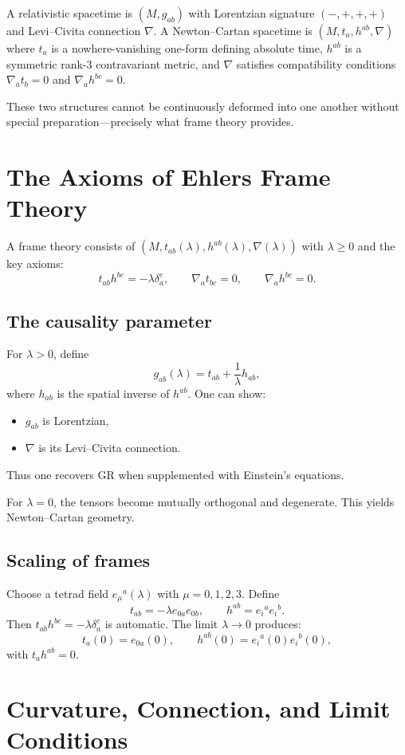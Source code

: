 \documentclass[12pt]{article}
\begin{document}
A relativistic spacetime is $(M,g_{ab})$ with 
Lorentzian signature $(-,+,+,+)$ and Levi--Civita connection $\nabla$.
A Newton--Cartan spacetime is $(M,t_a,h^{ab},\nabla)$ where 
$t_a$ is a nowhere-vanishing one-form defining absolute time, 
$h^{ab}$ is a symmetric rank-3 contravariant metric,
and $\nabla$ satisfies compatibility conditions
$\nabla_a t_b=0$ and $\nabla_a h^{bc}=0$.

These two structures cannot be continuously deformed into one another 
without special preparation—precisely what frame theory provides.

\section{The Axioms of Ehlers Frame Theory}

A frame theory consists of $(M,t_{ab}(\lambda),h^{ab}(\lambda),\nabla(\lambda))$
with $\lambda\ge0$ and the key axioms:
\[
t_{ab} h^{bc}=-\lambda\delta^c_a, 
\qquad 
\nabla_a t_{bc}=0,
\qquad 
\nabla_a h^{bc}=0.
\]

\subsection{The causality parameter}

For $\lambda>0$, define
\[
g_{ab}(\lambda)=t_{ab}+\frac1\lambda h_{ab},
\]
where $h_{ab}$ is the spatial inverse of $h^{ab}$.
One can show:
\begin{itemize}
\item $g_{ab}$ is Lorentzian,
\item $\nabla$ is its Levi--Civita connection.
\end{itemize}
Thus one recovers GR when supplemented with Einstein's equations.

For $\lambda=0$, the tensors become mutually orthogonal and degenerate.
This yields Newton--Cartan geometry.

\subsection{Scaling of frames}
Choose a tetrad field $e_\mu{}^a(\lambda)$ with $\mu=0,1,2,3$.
Define
\[
t_{ab}=-\lambda e_{0 a}e_{0 b}, \qquad 
h^{ab}=e_i{}^ae_i{}^b.
\]
Then $t_{ab}h^{bc}=-\lambda\delta^c_a$ is automatic.
The limit $\lambda\to0$ produces:
\[
t_a(0)=e_{0a}(0), \qquad
h^{ab}(0)=e_i{}^a(0)e_i{}^b(0),
\]
with $t_a h^{ab}=0$.

\section{Curvature, Connection, and Limit Conditions}
\end{document}
